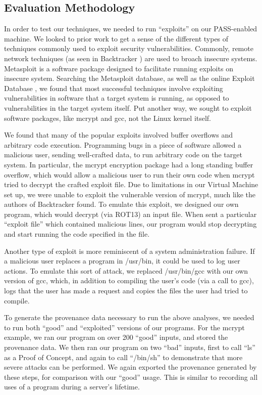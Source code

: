 \documentclass[10pt,twocolumn]{article}
\begin{document}
\subsection{Evaluation Methodology}
In order to test our techniques, we needed to run “exploits” on our PASS-enabled machine. We looked to prior work to get a sense of the different types of techniques commonly used to exploit security vulnerabilities. Commonly, remote network techniques (as seen in Backtracker \cite{backtracker}) are used to broach insecure systems. Metasploit \cite{metasploit} is a software package designed to facilitate running exploits on insecure system. Searching the Metasploit database, as well as the online Exploit Database \cite{exploitdb}, we found that most successful techniques involve exploiting vulnerabilities in software that a target system is running, as opposed to vulnerabilities in the target system itself. Put another way, we sought to exploit software packages, like mcrypt and gcc, not the Linux kernel itself. 

We found that many of the popular exploits involved buffer overflows and arbitrary code execution. Programming bugs in a piece of software allowed a malicious user, sending well-crafted data, to run arbitrary code on the target system. In particular, the mcrypt encryption package had a long standing buffer overflow, which would allow a malicious user to run their own code when mcrypt tried to decrypt the crafted exploit file. Due to limitations in our Virtual Machine set up, we were unable to exploit the vulnerable version of mcrypt, much like the authors of Backtracker \cite{backtracker} found. To emulate this exploit, we designed our own program, which would decrypt (via ROT13) an input file. When sent a particular “exploit file” which contained malicious lines, our program would stop decrypting and start running the code specified in the file.

Another type of exploit is more reminiscent of a system administration failure. If a malicious user replaces a program in /usr/bin, it could be used to log user actions. To emulate this sort of attack, we replaced /usr/bin/gcc with our own version of gcc, which, in addition to compiling the user’s code (via a call to gcc), logs that the user has made a request and copies the files the user had tried to compile. 

To generate the provenance data necessary to run the above analyses, we needed to run both “good” and “exploited” versions of our programs. For the mcrypt example, we ran our program on over 200 “good” inputs, and stored the provenance data. We then ran our program on two “bad” inputs, first to call “ls” as a Proof of Concept, and again to call “/bin/sh” to demonstrate that more severe attacks can be performed. We again exported the provenance generated by these steps, for comparison with our “good” usage. This is similar to recording all uses of a program during a server’s lifetime. 
\end{document}
